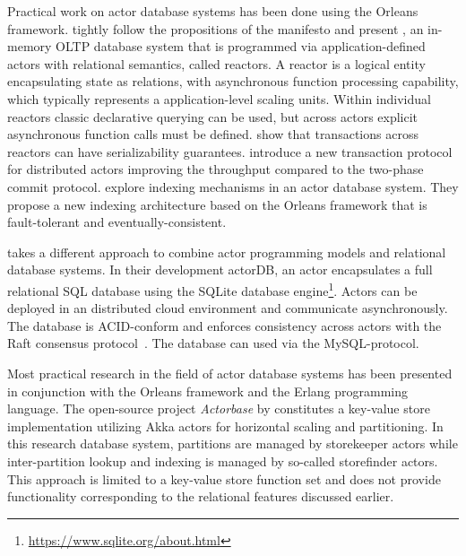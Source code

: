   Practical work on actor database systems has been done using the Orleans framework.
   tightly follow the propositions of the manifesto and present \reactdb{},
  an in-memory OLTP database system that is programmed via application-defined actors with relational semantics, called reactors.
  A reactor is a logical entity encapsulating state as relations, with
  asynchronous function processing capability, which typically represents a application-level scaling units.
  Within individual reactors classic declarative querying can be used, but across actors explicit asynchronous function calls must be defined.
  \citeauthor{Shah:reactdb} show that transactions across reactors can have serializability guarantees.
   introduce a new transaction protocol for distributed actors improving the throughput compared to the two-phase commit protocol.
   explore indexing mechanisms in an actor database system.
  They propose a new indexing architecture based on the Orleans framework that is fault-tolerant and eventually-consistent.

   takes a different approach to combine actor programming models and relational database systems.
  In their development actorDB, an actor encapsulates a full relational SQL database using the SQLite database engine\footnote{\url{https://www.sqlite.org/about.html}}.
  Actors can be deployed in an distributed cloud environment and communicate asynchronously.
  The database is ACID-conform and enforces consistency across actors with the Raft consensus protocol~\cite{raft}.
  The database can used via the MySQL-protocol.

  Most practical research in the field of actor database systems has been presented in conjunction with the Orleans framework and the Erlang programming language.
  The open-source project \textit{Actorbase} by \citet{actorbase} constitutes a key-value store implementation utilizing Akka actors for horizontal scaling and partitioning.
  In this research database system, partitions are managed by storekeeper actors while inter-partition lookup and indexing is managed by so-called storefinder actors.
  This approach is limited to a key-value store function set and does not provide functionality corresponding to the relational features discussed earlier.
